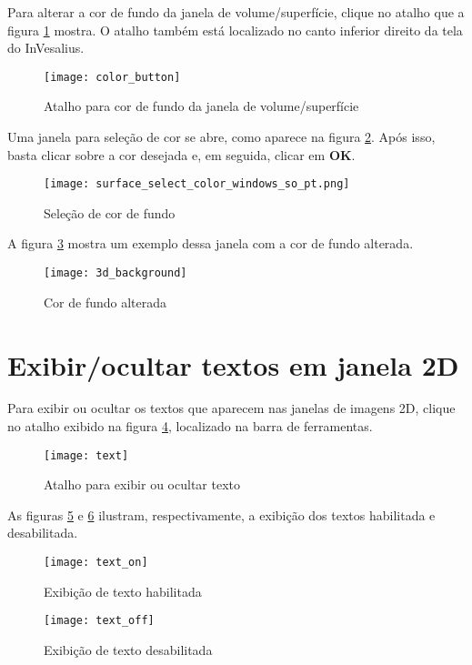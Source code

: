 Para alterar a cor de fundo da janela de volume/superfície, clique no atalho que a figura
\ref{fig:button_select_color_2} mostra. O atalho também está localizado no canto inferior
direito da tela do InVesalius.

\begin{figure}[!htb]
\centering
\texttt{[image: color\_button]}
\caption{Atalho para cor de fundo da janela de volume/superfície}
\label{fig:button_select_color_2}
\end{figure}

Uma janela para seleção de cor se abre, como aparece na figura \ref{fig:color_window_background}.
Após isso, basta clicar sobre a cor desejada e, em seguida, clicar em \textbf{OK}.

\begin{figure}[!htb]
\centering
\texttt{[image: surface\_select\_color\_windows\_so\_pt.png]}
\caption{Seleção de cor de fundo}
\label{fig:color_window_background}
\end{figure}

A figura \ref{fig:background_color} mostra um exemplo dessa janela com a cor de fundo alterada.

\begin{figure}[!htb]
\centering
\texttt{[image: 3d\_background]}
\caption{Cor de fundo alterada}
\label{fig:background_color}
\end{figure}

\newpage

\section{Exibir/ocultar textos em janela 2D}

Para exibir ou ocultar os textos que aparecem nas janelas de imagens 2D, clique no atalho
exibido na figura \ref{fig:text}, localizado na barra de ferramentas.

\begin{figure}[!htb]
\centering
\texttt{[image: text]}
\caption{Atalho para exibir ou ocultar texto}
\label{fig:text}
\end{figure}

As figuras \ref{fig:text_on} e \ref{fig:text_off} ilustram, respectivamente, a exibição
dos textos habilitada e desabilitada.

\begin{figure}[!htb]
\centering
\texttt{[image: text\_on]}
\caption{Exibição de texto habilitada}
\label{fig:text_on}
\end{figure}

\begin{figure}[!htb]
\centering
\texttt{[image: text\_off]}
\caption{Exibição de texto desabilitada}
\label{fig:text_off}
\end{figure}
